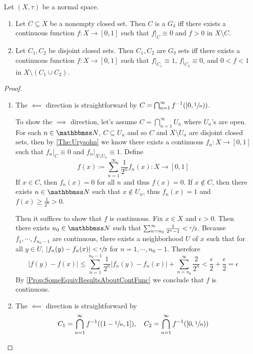 \documentclass[screen,single]{techreport}
\numberwithin{equation}{section}
\begin{document}
\begin{proposition}\label{Prop:GdeltaStrongerSeparation}
	Let $(X,\tau)$ be a normal space.
	\begin{enumerate}
		\item Let $C \subseteq X$ be a nonempty closed set.
		Then $C$ is a $G_\delta$ iff there exists a continuous function $f : X \to [0,1]$ such that $f|_C \equiv 0$ and $f > 0$ in $X \setminus C$.
		\item Let $C_1,C_2$ be disjoint closed sets.
		Then $C_1,C_2$ are $G_\delta$ sets iff there exists a continuous function $f: X \to [0,1]$ such that $f|_{C_1} \equiv 1$, $f|_{C_2} \equiv 0$, and $0 < f < 1$ in $X \setminus (C_1 \cup C_2)$.
	\end{enumerate}
\end{proposition}
\begin{proof}\
	\begin{enumerate}
		\item  The $\impliedby$ direction is straightforward by $C = \bigcap_{n=1}^\infty f^{-1}([0,\sfrac{1}{n}))$.
		
		To show the $\implies$ direction, let's assume $C = \bigcap_{n=1}^\infty U_n$ where $U_n$'s are open.
		For each $n \in \bbN$, $C \subseteq U_n$ and so $C$ and $X \setminus U_n$ are disjoint closed sets, then by \cref{The:Urysohn} we know there exists a continuous $f_n : X \to [0,1]$ such that $f_n|_C \equiv 0$ and $f_n|_{X \setminus U_n} \equiv 1$.
		Define
		\[
		f(x) \coloneqq \sum_{n=1}^\infty \frac{1}{2^n} f_n(x) : X \to [0,1]
		\]
		If $x \in C$, then $f_n(x) = 0$ for all $n$ and thus $f(x) = 0$.
		If $x \not\in C$, then there exists $n \in \bbN$ such that $x \not\in U_n$, thus $f_n(x) = 1$ and $f(x) \ge \frac{1}{2^n} > 0$.
		
		Then it suffices to show that $f$ is continuous.
		Fix $x \in X$ and $\epsilon > 0$.
		Then there exists $n_0 \in \bbN$ such that $\sum_{n=n_0}^\infty \frac{1}{2^n-1} < \sfrac{\epsilon}{2}$.
		Because $f_1,\cdots,f_{n_0-1}$ are continuous, there exists a neighborhood $U$ of $x$ such that for all $y \in U$, $|f_n(y) - f_n(x)| < \sfrac{\epsilon}{2}$ for $n=1,\cdots,n_0-1$.
		Therefore
		\[
			|f(y) - f(x)|  \le \sum_{n=1}^{n_0-1} \frac{1}{2^n} |f_n(y) - f_n(x)| + \sum_{n=n_0}^\infty \frac{2}{2^n} < \frac{\epsilon}{2} + \frac{\epsilon}{2} = \epsilon
		\]
		By \cref{Prop:SomeEquivResultsAboutContFunc} we conclude that $f$ is continuous.
		
		\item The $\impliedby$ direction is straightforward by
		\[
		C_1 = \bigcap_{n=1}^\infty f^{-1}((1-\sfrac{1}{n},1]), \quad C_2 = \bigcap_{n=1}^\infty f^{-1}([0,\sfrac{1}{n}))
		\]
		

\end{enumerate}
\end{proof}
\end{document}
